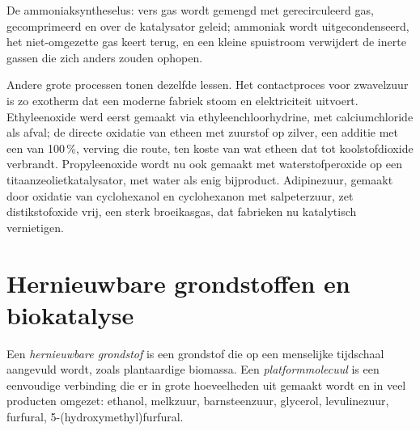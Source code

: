 \begin{omfigure}

{\small De ammoniaksyntheselus: vers gas wordt gemengd met
gerecirculeerd gas, gecomprimeerd en over de katalysator geleid;
ammoniak wordt uitgecondenseerd, het niet-omgezette gas keert terug, en
een kleine spuistroom verwijdert de inerte gassen die zich anders zouden
ophopen.}
\end{omfigure}

Andere grote processen tonen dezelfde lessen. Het contactproces voor
zwavelzuur is zo exotherm dat een moderne fabriek stoom en elektriciteit
uitvoert. Ethyleenoxide werd eerst gemaakt via ethyleenchloorhydrine, met
calciumchloride als afval; de directe oxidatie van etheen met zuurstof op
zilver, een additie met een  van 100\,\%, verving die
route, ten koste van wat etheen dat tot koolstofdioxide verbrandt.
Propyleenoxide wordt nu ook gemaakt met waterstofperoxide op een
titaanzeolietkatalysator, met water als enig bijproduct. Adipinezuur,
gemaakt door oxidatie van cyclohexanol en cyclohexanon met salpeterzuur,
zet distikstofoxide vrij, een sterk broeikasgas, dat fabrieken nu
katalytisch vernietigen.

\section{Hernieuwbare grondstoffen en biokatalyse}

\begin{definition}\label{def:b3:green-industrial:feedstock}
Een \emph{hernieuwbare grondstof} is een
grondstof die op een menselijke tijdschaal aangevuld wordt, zoals
plantaardige biomassa. Een
\emph{platformmolecuul} is een eenvoudige
verbinding die er in grote hoeveelheden uit gemaakt wordt en in veel
producten omgezet: ethanol, melkzuur, barnsteenzuur, glycerol,
levulinezuur, furfural, 5-(hydroxymethyl)furfural.
\end{definition}


